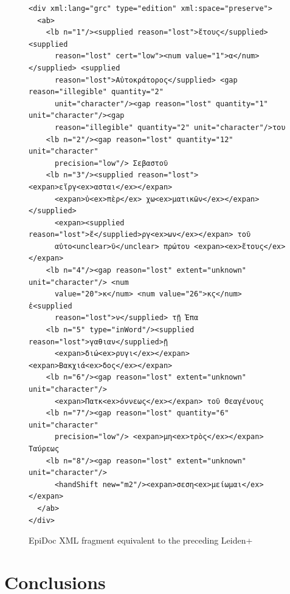 \documentclass[]{article}
\begin{document}
\begin{figure}[!hb]
  \begin{verbatim}
<div xml:lang="grc" type="edition" xml:space="preserve">
  <ab>
    <lb n="1"/><supplied reason="lost">ἔτους</supplied> <supplied
      reason="lost" cert="low"><num value="1">α</num> </supplied> <supplied
      reason="lost">Αὐτοκράτορος</supplied> <gap reason="illegible" quantity="2"
      unit="character"/><gap reason="lost" quantity="1" unit="character"/><gap
      reason="illegible" quantity="2" unit="character"/>του
    <lb n="2"/><gap reason="lost" quantity="12" unit="character"
      precision="low"/> Σεβαστοῦ
    <lb n="3"/><supplied reason="lost"><expan>εἴργ<ex>ασται</ex></expan>
      <expan>ὑ<ex>πὲρ</ex> χω<ex>ματικῶν</ex></expan></supplied>
      <expan><supplied reason="lost">ἔ</supplied>ργ<ex>ων</ex></expan> τοῦ
      αὐτο<unclear>ῦ</unclear> πρώτου <expan><ex>ἔτους</ex></expan>
    <lb n="4"/><gap reason="lost" extent="unknown" unit="character"/> <num
      value="20">κ</num> <num value="26">κϛ</num> ἐ<supplied
      reason="lost">ν</supplied> τῇ Ἐπα
    <lb n="5" type="inWord"/><supplied reason="lost">γαθιαν</supplied>ῇ
      <expan>διώ<ex>ρυγι</ex></expan> <expan>Βακχιά<ex>δος</ex></expan>
    <lb n="6"/><gap reason="lost" extent="unknown" unit="character"/>
      <expan>Πατκ<ex>όννεως</ex></expan> τοῦ Θεαγένους
    <lb n="7"/><gap reason="lost" quantity="6" unit="character"
      precision="low"/> <expan>μη<ex>τρὸς</ex></expan> Ταύρεως
    <lb n="8"/><gap reason="lost" extent="unknown" unit="character"/>
      <handShift new="m2"/><expan>σεση<ex>μείωμαι</ex></expan>
  </ab>
</div>
  \end{verbatim}
  \caption{EpiDoc XML fragment equivalent to the preceding Leiden+\label{epidoc}}
\end{figure}




\section*{Conclusions}



\end{document}

